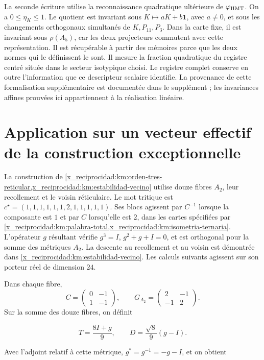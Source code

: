 La seconde écriture utilise la reconnaissance quadratique ultérieure
de \(\varphi_{\rm HMT}\).
On a \(0\le\eta_K\le1\).
Le quotient est invariant sous
\(K\mapsto aK+b\mathbf1\), avec \(a\ne0\), et sous les changements
orthogonaux simultanés de \(K,P_{11},P_3\).
Dans la carte fixe, il est invariant sous \(\rho(A_5)\), car les deux
projecteurs commutent avec cette représentation.
Il est récupérable à partir des mémoires parce que les deux normes qui le
définissent le sont.
Il mesure la fraction quadratique du registre centré située dans le
secteur isotypique choisi.
Le registre complet conserve en outre l’information que ce
descripteur scalaire identifie.
La provenance de cette formalisation supplémentaire est documentée dans
le supplément ; les invariances affines prouvées ici appartiennent
à la réalisation linéaire.

\section{Application sur un vecteur effectif de la construction exceptionnelle}

La construction de
\cref{x_reciprocidad:km:orden-tres-reticular,x_reciprocidad:km:estabilidad-vecino}
utilise douze fibres \(A_2\), leur recollement et le voisin réticulaire.
Le mot tritique est
\(c^\star=(1,1,1,1,1,1,2,1,1,1,1,1)\).
Ses blocs agissent par \(C^{-1}\) lorsque la composante est \(1\)
et par \(C\) lorsqu’elle est \(2\), dans les cartes spécifiées par
\cref{x_reciprocidad:km:palabra-total,x_reciprocidad:km:isometria-ternaria}.
L’opérateur \(g\) résultant vérifie
\(g^3=I\), \(g^2+g+I=0\), et est orthogonal pour la somme des
métriques \(A_2\).
La descente au recollement et au voisin est démontrée dans
\cref{x_reciprocidad:km:estabilidad-vecino}.
Les calculs suivants agissent sur son porteur réel de
dimension \(24\).

Dans chaque fibre,
\[
 C=\begin{pmatrix}0&-1\\1&-1\end{pmatrix},
 \qquad
 G_{A_2}=\begin{pmatrix}2&-1\\-1&2\end{pmatrix}.
\]
Sur la somme des douze fibres, on définit



\[
T=\frac{8I+g}{9},\qquad D=\frac{\sqrt8}{9}(g-I).
\]



Avec l’adjoint relatif à cette métrique,
\(g^*=g^{-1}=-g-I\), et on obtient



